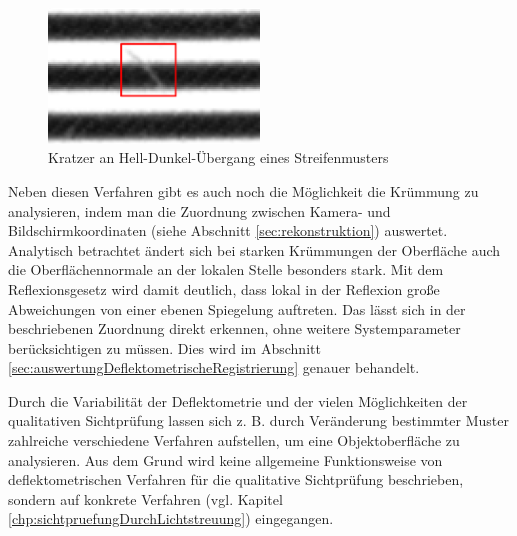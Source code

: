 \begin{figure}[H]
	\centering
	\includegraphics[width=0.5\textwidth]{02_grundlagenDerDeflektometrie/qualitativeSichtpruefung/figures/scratch}
	\caption[Kratzer an Hell-Dunkel-Übergang eines Streifenmusters]{Kratzer an Hell-Dunkel-Übergang eines Streifenmusters}
	\label{img:scratch}
\end{figure}

\noindent
Neben diesen Verfahren gibt es auch noch die Möglichkeit die Krümmung zu analysieren, indem man die Zuordnung zwischen Kamera- und Bildschirmkoordinaten (siehe Abschnitt \ref{sec:rekonstruktion}) auswertet.
Analytisch betrachtet ändert sich bei starken Krümmungen der Oberfläche auch die Oberflächennormale an der lokalen Stelle besonders stark.
Mit dem Reflexionsgesetz wird damit deutlich, dass lokal in der Reflexion große Abweichungen von einer ebenen Spiegelung auftreten.
Das lässt sich in der beschriebenen Zuordnung direkt erkennen, ohne weitere Systemparameter berücksichtigen zu müssen.
Dies wird im Abschnitt \ref{sec:auswertungDeflektometrischeRegistrierung} genauer behandelt.

\p
Durch die Variabilität der Deflektometrie und der vielen Möglichkeiten der qualitativen Sichtprüfung lassen sich z. B. durch Veränderung bestimmter Muster zahlreiche verschiedene Verfahren aufstellen, um eine Objektoberfläche zu analysieren.
Aus dem Grund wird keine allgemeine Funktionsweise von deflektometrischen Verfahren für die qualitative Sichtprüfung beschrieben, sondern auf konkrete Verfahren (vgl. Kapitel \ref{chp:sichtpruefungDurchLichtstreuung}) eingegangen.